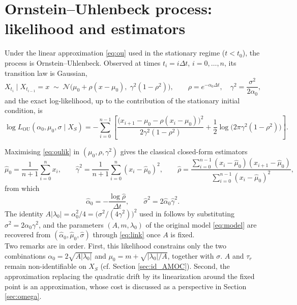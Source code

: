 \documentclass[12pt,a4paper]{article}
\theoremstyle{definition}
\theoremstyle{plain}
\begin{document}
\section{Ornstein--Uhlenbeck process: likelihood and estimators}
\label{app:ou}
 
Under the linear approximation \eqref{eq:ou} used in the stationary regime ($t<t_0$), the
process is Ornstein--Uhlenbeck. Observed at times $t_i=i\Delta t$, $i=0,\dots,n$, its transition
law is Gaussian,
\[
X_{t_i}\mid X_{t_{i-1}}=x \;\sim\;
\mathcal{N}\Big(\mu_0+\rho(x-\mu_0),\;\gamma^2(1-\rho^2)\Big),
\qquad \rho=e^{-\alpha_0\Delta t},\quad\gamma^2=\frac{\sigma^2}{2\alpha_0},
\]
and the exact log-likelihood, up to the contribution of the stationary initial condition, is
\begin{equation}
\label{eq:oulik}
\log L_{\mathrm{OU}}(\alpha_0,\mu_0,\sigma\mid X_S)=
-\sum_{i=0}^{n-1}\left[\frac{\big(x_{i+1}-\mu_0-\rho(x_i-\mu_0)\big)^2}{2\gamma^2(1-\rho^2)}
+\frac12\log\!\big(2\pi\gamma^2(1-\rho^2)\big)\right] .
\end{equation}
 
\noindent Maximising \eqref{eq:oulik} in $(\mu_0,\rho,\gamma^2)$ gives the classical closed-form
estimators
\[
\hat\mu_0=\frac1{n+1}\sum_{i=0}^{n}x_i,\qquad
\hat\gamma^2=\frac1{n+1}\sum_{i=0}^{n}(x_i-\hat\mu_0)^2,\qquad
\hat\rho=\frac{\sum_{i=0}^{n-1}(x_i-\hat\mu_0)(x_{i+1}-\hat\mu_0)}
{\sum_{i=0}^{n-1}(x_i-\hat\mu_0)^2},
\]
from which
\begin{equation}
\label{eq:ouest}
\hat\alpha_0=-\frac{\log\hat\rho}{\Delta t},\qquad \hat\sigma^2=2\hat\alpha_0\hat\gamma^2 .
\end{equation}
The identity $A|\lambda_0|=\alpha_0^2/4=\big(\sigma^2/(4\gamma^2)\big)^2$ used in
\cite{ditlevsen2023} follows by substituting $\sigma^2=2\alpha_0\gamma^2$, and the parameters
$(A,m,\lambda_0)$ of the original model \eqref{eq:model} are recovered from
$(\hat\alpha_0,\hat\mu_0,\hat\sigma)$ through \eqref{eq:link} once $A$ is fixed. \\
 
\noindent Two remarks are in order. First, this likelihood constrains only the two combinations
$\alpha_0=2\sqrt{A|\lambda_0|}$ and $\mu_0=m+\sqrt{|\lambda_0|/A}$, together with $\sigma$. $A$ and $\tau_r$
remain non-identifiable on $X_S$ (cf. Section \ref{sec:id_AMOC}). Second, the approximation
replacing the quadratic drift by its linearization around the fixed point is an
approximation, whose cost is discussed as a perspective in Section \ref{sec:omega}.
 
\end{document}
